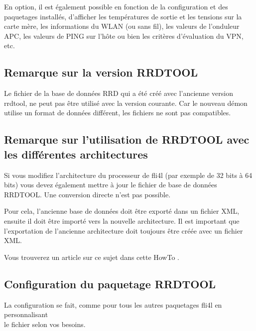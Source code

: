 En option, il est également possible en fonction de la configuration et des
paquetages installés, d'afficher les températures de sortie et les tensions
sur la carte mère, les informations du WLAN (ou sans fil), les valeurs de
l'onduleur APC, les valeurs de PING sur l'hôte ou bien les critères
d'évaluation du VPN, etc.

\subsection {Remarque sur la version RRDTOOL}

  Le fichier de la base de données RRD qui a été créé avec l'ancienne version
  rrdtool, ne peut pas être utilisé avec la version courante. Car le nouveau démon
  utilise un format de données différent, les fichiers ne sont pas compatibles.

\subsection {Remarque sur l'utilisation de RRDTOOL avec les différentes architectures}

  Si vous modifiez l'architecture du processeur de fli4l (par exemple de 32 bits
  à 64 bits) vous devez également mettre à jour le fichier de base de données RRDTOOL.
  Une conversion directe n'est pas possible.
  
  Pour cela, l'ancienne base de données doit être exporté dans un fichier XML, ensuite il
  doit être importé vers la nouvelle architecture. Il est important que l'exportation de
  l'ancienne architecture doit toujours être créée avec un fichier XML.
  
  Vous trouverez un article sur ce sujet dans cette HowTo
  .

\subsection {Configuration du paquetage RRDTOOL}

  La configuration se fait, comme pour tous les autres paquetages fli4l en
  personnalisant\\
  le fichier  selon vos besoins.

